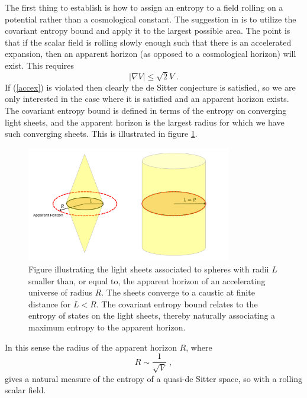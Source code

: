 \documentclass[11pt,a4paper]{article}
\numberwithin{equation}{section}
\numberwithin{table}{section}\setlength{\multlinegap}{25pt}
\newcommand{\be}{\begin{equation}}
\newcommand{\ee}{\end{equation}}
\begin{document}
{The first thing to establish is how to assign an entropy to a field rolling on a potential rather than a cosmological constant. The suggestion in \cite{Ooguri:2018wrx} is to utilize the covariant entropy bound \cite{Fischler:1998st,Bousso:1999xy} and apply it to the largest possible area. The point is that if the scalar field is rolling slowly enough such that there is an accelerated expansion, then an apparent horizon (as opposed to a cosmological horizon) will exist. This requires
\be
\left| \nabla V \right| \leq \sqrt{2} V \;.
\label{accex}
\ee
If (\ref{accex}) is violated then clearly the de Sitter conjecture is satisfied, so we are only interested in the case where it is satisfied and an apparent horizon exists. The covariant entropy bound is defined in terms of the entropy on converging light sheets, and the apparent horizon is the largest radius for which we have such converging sheets. This is illustrated in figure \ref{fig:ls}. 
\begin{figure}[t]
\centering
 \includegraphics[width=0.8\textwidth]{lights.pdf}
\caption{Figure illustrating the light sheets associated to spheres with radii $L$ smaller than, or equal to, the apparent horizon of an accelerating universe of radius $R$. The sheets converge to a caustic at finite distance for $L<R$. The covariant entropy bound relates to the entropy of states on the light sheets, thereby naturally associating a maximum entropy to the apparent horizon. }
\label{fig:ls}
\end{figure}
In this sense the radius of the apparent horizon $R$, where
\be
R \sim \frac{1}{\sqrt{V}} \;,
\ee
gives a natural measure of the entropy of a quasi-de Sitter space, so with a rolling scalar field.

}
\end{document}
